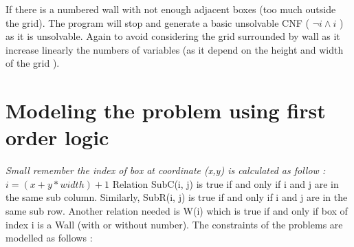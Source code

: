 \documentclass[a4paper]{article}
\begin{document}
\medskip

If there is a numbered wall with not enough adjacent boxes (too much outside the grid). The program will stop and generate a basic unsolvable CNF ( $\neg i \land i $ ) as it is unsolvable. Again to avoid considering the grid surrounded by wall as it increase linearly the numbers of variables (as it depend on the height and width of the grid ).

\section{Modeling the problem using first order logic}
\textit{Small remember the index of box at coordinate (x,y) is calculated as follow : $i = (x+y*width)+1$}
Relation SubC(i, j) is true if and only if i and j are in the same sub column. Similarly, SubR(i, j) is true if and only if i and j are in the same sub row. Another relation needed is W(i) which is true if and only if box of index i is a Wall (with or without number).  The constraints of the problems are modelled as follows :
\end{document}
